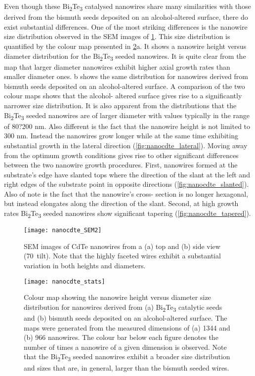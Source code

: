 Even though these Bi\textsubscript{2}Te\textsubscript{3} catalysed nanowires share
many similarities with those derived from the bismuth seeds
deposited on an alcohol-altered surface, there do exist
substantial differences. One of the most striking differences
is the nanowire size distribution observed in the SEM images
of \cref{fig:nanocdte_SEM2}. This size distribution is quantified by the colour
map presented in \cref{fig:nanocdte_stats}a. It shows a nanowire height
versus diameter distribution for the Bi\textsubscript{2}Te\textsubscript{3} seeded nanowires. It is quite clear from the map that larger diameter nanowires exhibit higher axial growth rates than smaller diameter ones. b shows the same distribution for nanowires derived 
from bismuth seeds deposited on an alcohol-altered surface. A 
comparison of the two colour maps shows that the alcohol- 
altered surface gives rise to a significantly narrower size 
distribution. It is also apparent from the distributions that the 
Bi\textsubscript{2}Te\textsubscript{3} seeded nanowires are of larger diameter with values typically in the range of 80?200 nm. Also different is the fact that the nanowire height is not limited to 300 nm. Instead the nanowires grow longer while at the same time exhibiting
substantial growth in the lateral direction (\cref{fig:nanocdte_lateral}).
Moving away from the optimum growth conditions gives
rise to other significant differences between the two nanowire
growth procedures. First, nanowires formed at the substrate's
edge have slanted tops where the direction of the slant at the
left and right edges of the substrate point in opposite directions
(\cref{fig:nanocdte_slanted}). Also of note is the fact that the nanowire's cross-
section is no longer hexagonal, but instead elongates along the
direction of the slant. Second, at high growth rates Bi\textsubscript{2}Te\textsubscript{3}
seeded nanowires show significant tapering (\cref{fig:nanocdte_tapered}).
\begin{figure}
    \centering
    \texttt{[image: nanocdte\_SEM2]}
    \caption[SEM image of CdTe nanowires]{\label{fig:nanocdte_SEM2}SEM images of CdTe nanowires from a (a) top and (b) side view (70\degree~tilt). Note that the highly faceted wires exhibit a substantial variation in both heights and diameters.}
\end{figure}
\begin{figure}
    \centering
    \texttt{[image: nanocdte\_stats]}
    \caption[CdTe nanowire dimension colourmap]{\label{fig:nanocdte_stats}Colour map showing the nanowire height versus diameter size distribution for nanowires derived from (a) Bi\textsubscript{2}Te\textsubscript{3} catalytic seeds
        and (b) bismuth seeds deposited on an alcohol-altered surface. The maps were generated from the measured dimensions of (a) 1344 and
        (b) 966 nanowires. The colour bar below each figure denotes the number of times a nanowire of a given dimension is observed. Note that the
        Bi\textsubscript{2}Te\textsubscript{3} seeded nanowires exhibit a broader size distribution and sizes that are, in general, larger than the bismuth seeded wires.}
\end{figure}
